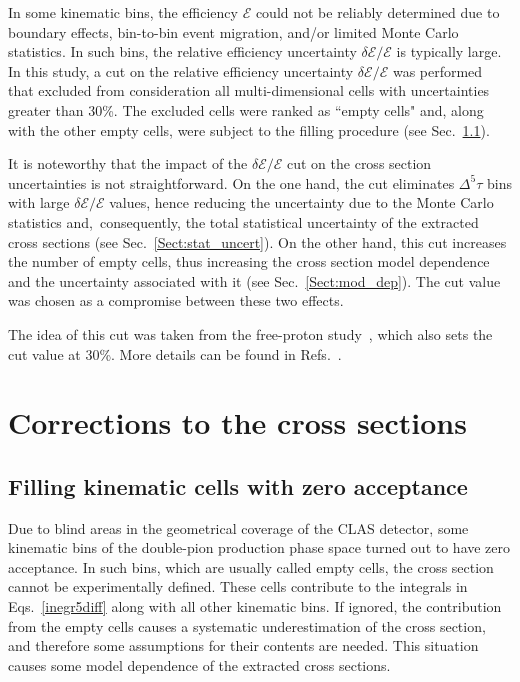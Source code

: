 \documentclass[prc,twocolumn,superscriptaddress,showpacs,amssymb,amsmath,amsfonts,aps,nofootinbib]{revtex4-1}
\begin{document}
In some kinematic bins, the efficiency $\mathcal{E}$ could not be reliably determined due to boundary effects, bin-to-bin event migration, and/or limited Monte Carlo statistics. In such bins, the relative efficiency uncertainty $\delta \mathcal{E}/\mathcal{E}$ is typically large. In this study, a cut on the relative efficiency uncertainty $\delta \mathcal{E}/\mathcal{E}$ was performed that excluded from consideration all multi-dimensional cells with uncertainties greater than 30\%. The excluded cells were ranked as ``empty cells" and, along with the other empty cells, were subject to the filling procedure (see Sec.\!~\ref{Sect:empt_cells}).


It is noteworthy that the impact of the $\delta \mathcal{E}/\mathcal{E}$ cut on the cross section uncertainties is not straightforward. On the one hand, the cut eliminates $\Delta^{5} \tau$ bins with large $\delta \mathcal{E}/\mathcal{E}$ values, hence reducing the uncertainty due to the Monte Carlo statistics and,~consequently, the total statistical uncertainty of the extracted cross sections (see Sec.\!~\ref{Sect:stat_uncert}). On the other hand, this cut increases the number of empty cells, thus increasing the cross section model dependence and the uncertainty associated with it (see Sec.\!~\ref{Sect:mod_dep}). The cut value was chosen as a compromise between these two effects. 

The idea of this cut was taken from the free-proton study~\cite{Fed_an_note:2017,Fed_paper_2018}, which also sets the cut value at 30\%. More details can be found in Refs.\!~\cite{my_an_note:2020, my_thesis:2021,Fed_an_note:2017,Fed_paper_2018}.


\section{Corrections to the cross sections}

\subsection{Filling kinematic cells with zero acceptance}
\label{Sect:empt_cells}


Due to blind areas in the geometrical coverage of the CLAS detector, some kinematic bins of the double-pion production phase space turned out to have zero acceptance. In such bins, which are usually called empty cells, the cross section cannot be experimentally defined. These cells contribute to the integrals in Eqs.\!~\eqref{inegr5diff} along with all other kinematic bins. If ignored, the contribution from the empty cells causes a systematic underestimation of the cross section, and therefore some assumptions for their contents are needed. This situation causes some model dependence of the extracted cross sections. 
\end{document}
